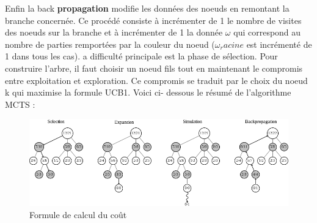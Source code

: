 \documentclass[12pt]{article}
\begin{document}
Enfin la back \textbf{propagation} modifie les données des noeuds en remontant la branche
concernée. Ce procédé consiste à incrémenter de 1 le nombre de visites des noeuds sur
la branche et à incrémenter de 1 la donnée $ \omega $ qui correspond au nombre de parties
remportées par la couleur du noeud ($\omega_racine $ est incrémenté de 1 dans tous les cas).
a diﬃculté principale est la phase de sélection. Pour construire l’arbre, il faut choisir un
noeud fils tout en maintenant le compromis entre exploitation et exploration. Ce
compromis se traduit par le choix du noeud k qui maximise la formule UCB1. Voici ci-
dessous le résumé de l’algorithme MCTS :
	\begin{figure}[h!]
		\centering
		\includegraphics[width = 1\textwidth]{images/MCTS_(French).svg.png}
		\caption{Formule de calcul du coût}
		\label{eq1}
	\end{figure}
\end{document}
